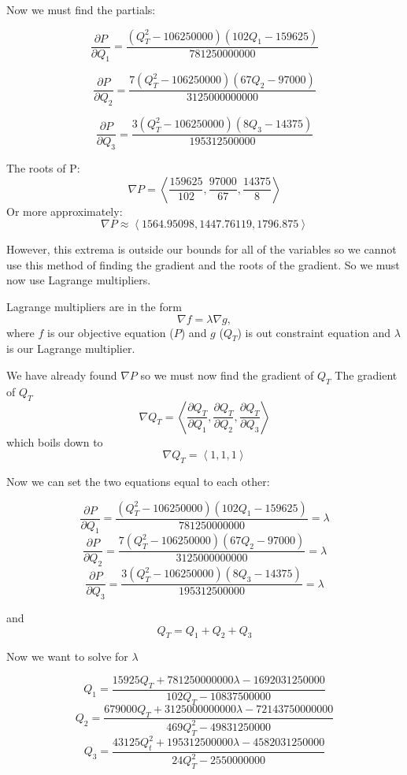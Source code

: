\documentclass{report}
\begin{document}
Now we must find the partials:

$$\frac{\partial P}{\partial Q_1} = \dfrac{\left(Q_T^2-106250000\right)\left(102Q_1-159625\right)}{781250000000}$$

$$\frac{\partial P}{\partial Q_2}=\dfrac{7\left(Q_T^2-106250000\right)\left(67Q_2-97000\right)}{3125000000000}$$

$$\frac{\partial P}{\partial Q_3} = \dfrac{3\left(Q_T^2-106250000\right)\left(8Q_3-14375\right)}{195312500000}$$

\vspace{5mm}

The roots of P:
$$\nabla P = \left\langle \dfrac{159625}{102},\dfrac{97000}{67},\dfrac{14375}{8}\right\rangle$$
Or more approximately:
$$\nabla P \approx \left\langle1564.95098,1447.76119,1796.875\right\rangle$$

However, this extrema is outside our bounds for all of the variables so we cannot use this method of finding the gradient and the roots of the gradient. So we must now use Lagrange multipliers. 



\vspace{5mm}
Lagrange multipliers are in the form $$\nabla f = \lambda \nabla g,$$ where $f$ is our objective equation ($P$) and $g$ ($Q_T$) is out constraint equation and $\lambda$ is our Lagrange multiplier. 

We have already found $\nabla P$ so we must now find the gradient of $Q_T$ The gradient of $Q_T$ 
$$\nabla Q_T = \left\langle\frac{\partial Q_T}{\partial Q_1},\frac{\partial Q_T}{\partial Q_2},\frac{\partial Q_T}{\partial Q_3}\right\rangle$$ which boils down to $$\nabla Q_T = \left\langle1,1,1\right\rangle$$

Now we can set the two equations equal to each other:

$$\frac{\partial P}{\partial Q_1} = \dfrac{\left(Q_T^2-106250000\right)\left(102Q_1-159625\right)}{781250000000}=\lambda$$
$$\frac{\partial P}{\partial Q_2}=\dfrac{7\left(Q_T^2-106250000\right)\left(67Q_2-97000\right)}{3125000000000}=\lambda$$
$$\frac{\partial P}{\partial Q_3} = \dfrac{3\left(Q_T^2-106250000\right)\left(8Q_3-14375\right)}{195312500000} = \lambda$$

and $$Q_T=Q_1+Q_2+Q_3$$

Now we want to solve for $\lambda$

$$Q_1 = \frac{15925Q_T+781250000000\lambda -1692031250000}{102Q_T-10837500000}$$
$$Q_2 = \frac{679000Q_T + 3125000000000\lambda - 72143750000000}{469Q_T^2-49831250000}$$
$$Q_3 = \frac{43125Q_t^2+195312500000\lambda - 4582031250000}{24Q_T^2-2550000000}$$
\end{document}
